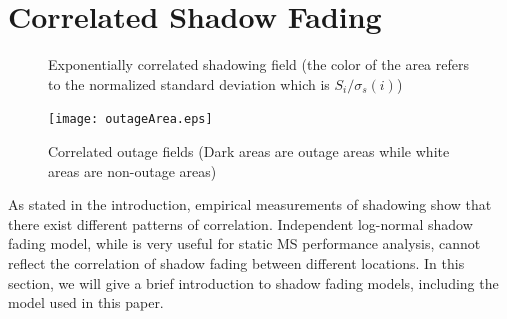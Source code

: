 \documentclass[journal,10pt]{IEEEtran}
\begin{document}
\section{Correlated Shadow Fading}
 \begin{figure}
 \centering
{}
\hfil
{}
 \caption{Exponentially correlated shadowing field (the color of the area refers to the normalized standard deviation  which is $S_{i}/\sigma_{s}(i)$)}
\label{SF}
 \end{figure}
  \begin{figure}
 \centering
 \texttt{[image: outageArea.eps]}
 \caption{Correlated outage fields (Dark areas are outage areas while white areas are non-outage areas)}
 \label{4:outagefie}
 \end{figure}
\label{CorrShadowField}
As stated in the introduction, empirical measurements of shadowing show that there exist different patterns of correlation. Independent log-normal shadow fading model, while is very useful for static MS performance analysis, cannot reflect the correlation of shadow fading between different locations. In this section, we will give a brief introduction to shadow fading models, including the model used in this paper.
\end{document}
